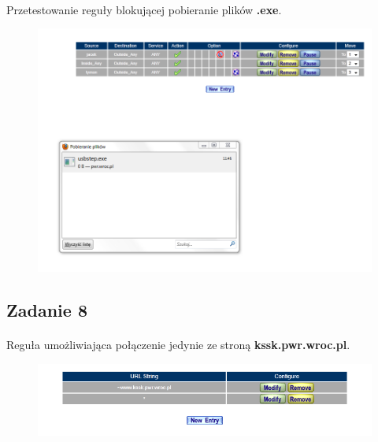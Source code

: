 \documentclass[wide,a4paper,titlepage,12pt] {article}
\begin{document}
  \paragraph{}
  Przetestowanie reguły blokującej pobieranie plików \textbf{.exe}.
  \begin{figure}[h!]
    \begin{center}
      \includegraphics[width=\textwidth]{pobieranie_exe.PNG}
    \end{center}
  \end{figure}



  \subsection{Zadanie 8}
  \paragraph{}
  Reguła umożliwiająca połączenie jedynie ze stroną \textbf{kssk.pwr.wroc.pl}.
  \begin{figure}[h!]
    \begin{center}
      \includegraphics[width=\textwidth]{8.PNG}
    \end{center}
  \end{figure}
\end{document}
